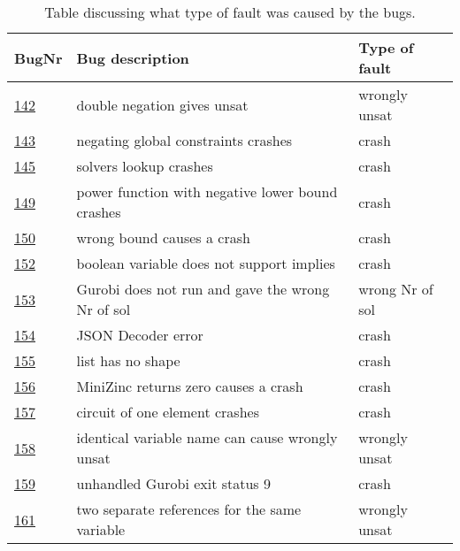 \begin{table}[]
	\caption{Table discussing what type of fault was caused by the bugs.}
	\label{tab:bug:fault}
	\centering
	\begin{tabular}{lll}
		\hline
		BugNr & Bug description                                           & Type of fault   \\ \toprule
		\href{https://github.com/CPMpy/cpmpy/issues/142}{142} & double negation gives unsat                            & wrongly unsat   \\
		\href{https://github.com/CPMpy/cpmpy/issues/143}{143} & negating global constraints crashes                 & crash           \\
		\href{https://github.com/CPMpy/cpmpy/issues/145}{145} & solvers lookup crashes                            & crash           \\
		\href{https://github.com/CPMpy/cpmpy/issues/149}{149} & power function with negative lower bound crashes  & crash           \\
		\href{https://github.com/CPMpy/cpmpy/issues/150}{150} & wrong bound causes a crash                  & crash           \\
		\href{https://github.com/CPMpy/cpmpy/issues/152}{152} & boolean variable does not support implies         & crash           \\
		\href{https://github.com/CPMpy/cpmpy/issues/153}{153} & Gurobi does not run and gave the wrong Nr of sol  & wrong Nr of sol \\
		\href{https://github.com/CPMpy/cpmpy/issues/154}{154} & JSON Decoder error                                & crash           \\
		\href{https://github.com/CPMpy/cpmpy/issues/155}{155} & list has no shape                                 & crash           \\
		\href{https://github.com/CPMpy/cpmpy/issues/156}{156} & MiniZinc returns zero causes a crash              & crash           \\
		\href{https://github.com/CPMpy/cpmpy/issues/157}{157} & circuit of one element crashes                    & crash           \\
		\href{https://github.com/CPMpy/cpmpy/issues/158}{158} & identical variable name can cause wrongly unsat   & wrongly unsat   \\
		\href{https://github.com/CPMpy/cpmpy/issues/159}{159} & unhandled Gurobi exit status 9                    & crash           \\
		\href{https://github.com/CPMpy/cpmpy/issues/161}{161} & two separate references for the same variable     & wrongly unsat   \\

\end{tabular}
\end{table}
